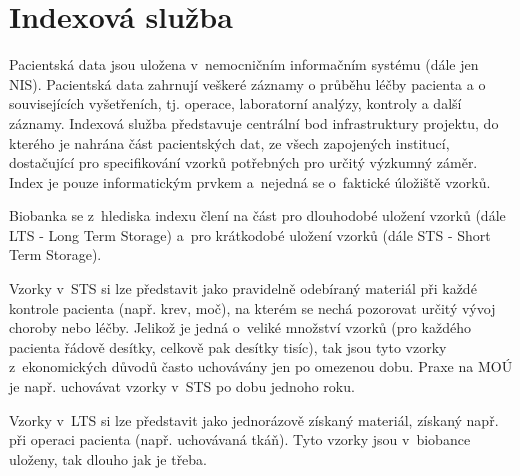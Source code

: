 \section{Indexová služba}
Pacientská data jsou uložena v~nemocničním informačním systému (dále jen NIS). Pacientská data zahrnují veškeré záznamy o průběhu léčby pacienta a o souvisejících vyšetřeních, tj. operace, laboratorní analýzy, kontroly a další záznamy. Indexová služba \ProjectName představuje centrální bod infrastruktury projektu, do kterého je nahrána část pacientských dat, ze všech zapojených institucí, dostačující pro specifikování vzorků potřebných pro určitý výzkumný záměr. Index je pouze informatickým prvkem a~nejedná se o~faktické úložiště vzorků.

Biobanka se z~hlediska indexu člení na část pro dlouhodobé uložení vzorků (dále LTS - Long Term Storage) a~pro krátkodobé uložení vzorků (dále STS - Short Term Storage). 

Vzorky v~STS si lze představit jako pravidelně odebíraný materiál při každé kontrole pacienta (např. krev, moč), na kterém se nechá pozorovat určitý vývoj choroby nebo léčby. Jelikož je jedná o~veliké množství vzorků (pro každého pacienta řádově desítky, celkově pak desítky tisíc), tak jsou tyto vzorky z~ekonomických důvodů často uchovávány jen po omezenou dobu. Praxe na MOÚ je např. uchovávat vzorky v~STS po dobu jednoho roku.

Vzorky v~LTS si lze představit jako jednorázově získaný materiál, získaný např. při operaci pacienta (např. uchovávaná tkáň). Tyto vzorky jsou v~biobance uloženy, tak dlouho jak je třeba. 

